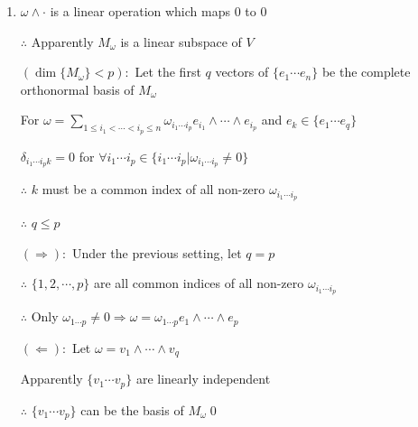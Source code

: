 \begin{enumerate}[4]
    \item
    $\omega \wedge \cdot$ is a linear operation which maps $0$ to $0$
    \par $\therefore$ Apparently $M_{\omega}$ is a linear subspace of $V$
    \par $(\dim\{M_{\omega}\}<p):$ Let the first $q$ vectors of $\{e_1 \cdots e_n\}$ be the complete orthonormal basis of $M_{\omega}$
    \par For $\omega=\sum\limits_{1\leqslant i_1 < \cdots < i_p \leqslant n} \omega_{i_1 \cdots i_p} e_{i_1}\wedge \cdots \wedge e_{i_p}$ and $e_k\in \{e_1 \cdots e_q\}$
    \par $\delta_{i_1 \cdots i_p k}=0$ for $\forall i_1 \cdots i_p \in  \{i_1 \cdots i_p|\omega_{i_1 \cdots i_p}\neq 0\}$
    \par $\therefore$ $k$ must be a common index of all non-zero $\omega_{i_1 \cdots i_p}$
    \par $\therefore$ $q\leqslant p$
    \par $(\Rightarrow):$ Under the previous setting, let $q=p$
    \par $\therefore$ $\{1,2,\cdots,p\}$ are all common indices of all non-zero $\omega_{i_1 \cdots i_p}$
    \par $\therefore$ Only $\omega_{1\cdots p}\neq 0 \Rightarrow \omega =\omega_{1\cdots p} e_1 \wedge \cdots \wedge e_p$
    \par $(\Leftarrow):$ Let $\omega =v_1 \wedge \cdots \wedge v_q$
    \par Apparently $\{v_1 \cdots v_p\}$ are linearly independent
    \par $\therefore$ $\{v_1 \cdots v_p\}$ can be the basis of $M_{\omega} $\qed
\end{enumerate}